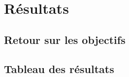 \section{Résultats}

	\subsection{Retour sur les objectifs}
	
		\paragraph{}

	\subsection{Tableau des résultats}

		\paragraph{}
		